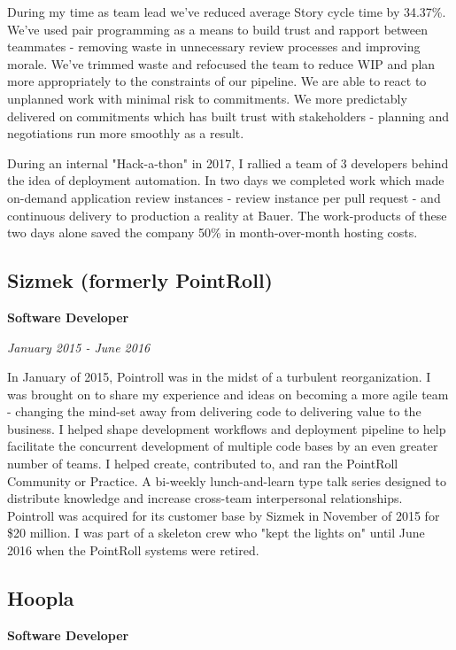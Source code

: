 \documentclass[12pt letterpaper notitlepage]{article}
\begin{document}
During my time as team lead we've reduced average Story cycle time by 34.37\%. We've used pair programming as a means to build trust and rapport between teammates - removing waste in unnecessary review processes and improving morale. We've trimmed waste and refocused the team to reduce WIP and plan more appropriately to the constraints of our pipeline. We are able to react to unplanned work with minimal risk to commitments. We more predictably delivered on commitments which has built trust with stakeholders - planning and negotiations run more smoothly as a result.

During an internal "Hack-a-thon" in 2017, I rallied a team of 3 developers behind the idea of deployment automation. In two days we completed work which made on-demand application review instances - review instance per pull request - and continuous delivery to production a reality at Bauer. The work-products of these two days alone saved the company 50\% in month-over-month hosting costs.

\subsection*{Sizmek (formerly PointRoll)}
\label{sec:org4aaad9c}

\textbf{Software Developer}

\emph{January 2015 - June 2016}

In January of 2015, Pointroll was in the midst of a turbulent reorganization. I was brought on to share my experience and ideas on becoming a more agile team - changing the mind-set away from delivering code to delivering value to the business. I helped shape development workflows and deployment pipeline to help facilitate the concurrent development of multiple code bases by an even greater number of teams. I helped create, contributed to, and ran the PointRoll Community or Practice. A bi-weekly lunch-and-learn type talk series designed to distribute knowledge and increase cross-team interpersonal relationships. Pointroll was acquired for its customer base by Sizmek in November of 2015 for \$20 million. I was part of a skeleton crew who "kept the lights on" until June 2016 when the PointRoll systems were retired.

\subsection*{Hoopla}
\label{sec:orgb34ed78}

\textbf{Software Developer}
\end{document}

